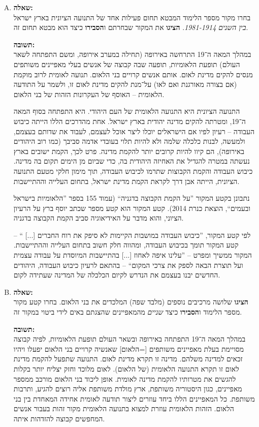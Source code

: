 \documentclass[a4paper]{article}
\newcommand\hl[1]   {#1}
\begin{document}
\begin{enumerate}[A.]
			\item \textbf{שאלה: }\\
			בחרו מקור מספר הלימוד המבטא תחום פעילות אחד של התנועה הציונית בארץ ישראל \textit{בין השנים 1981-1914}. \textbf{הציגו} את המקור שבחרתם ו\textbf{הסבירו} כיצד הוא מבטא תחום זה. 
			
			\textbf{תשובה: }\\ 
			במהלך המאה ה־19 התרחשה באירופה (תחילה במערב אירופה, ומשם התפתחה לשאר העולם) תופעת הלאומיות, תופעה שבה קבוצה של אנשים בעלי מאפיינים משותפים מנסים להקים מדינת לאום. אותם אנשים קרויים בני הלאום. תנועה לאומית לרוב מוקמת (אם בצורה מאורגנת ואם לאו) על־מנת להקים מדינת לאום זו, ולשמר על התודעה הלאומית – האוסף של העקרונות הזהות של בני הלאום. 
			
			התנועה הציונית היא התנועה הלאומית של העם היהודי. היא התפתחה בסוף המאה ה־19, ומטרתה להקים מדינה יהודית בארץ ישראל. אחת מהדרכים הללו הייתה כיבוש העבודה – רעיון לפיו אם הישראלים יוכלו ליצר אוכל לעצמם, לעבוד את שדותם בעצמם, ולמעשה, לבנות כלכלה שלמה ולא להיות תלוי בעובדי אדמה סביבך (כמו רוב היהודים באירופה), הם קיוו להיות קרובים יותר להקמת מדינה. פרט לכך, הקמת ישובים בארץ נעשתה במטרה להגדיל את האחיזה היהודית בה, כדי שביום מן הימים תקום בה מדינה. כיבוש העבודה והקמת הקבוצות שתרמו לכיבוש העבודה, תוך מימון חלקי מטעם התנועה הציונית, הייתה אבן דרך לקראת הקמת מדינת ישראל, בתחום העלייה וההתיישבות. 
			
			נתבונן בקטע המקור ''על הקמת הקבוצה בדגניה`` (עמוד 155 בספר ''הלאומיות בישראל ובעמים``, הוצאת כנרת 2014). קטע המקור הוא קטע מספר שכתב יוסף ברץ על הרעיון הציוני, והוא מדבר על האידיאוגיה סביב הקמת הקבוצה בדגניה. 
			
			לפי קטע המקור, ''כיבוש העבודה במושבות הקיימות לא סיפק את רוח החברים [...] `` – קטע המקור תומך בכיבוש העבודה, ומהווה חלק חשוב בתחום העלייה וההתיישבות. המקור ממשיך ומפרט – ''עלינו איפה לאחוז [...] בהתיישבות המיוסדת על עבודה עצמית ועל תוצרת הבאה לספק את צרכי המקום`` – בהתאם לרעיון כיבוש העבודה, היהודים החדשים יבנו בעצמם את הנדרש לקיום הכלכלה של המדינה שעתידה לקום. 
			
			\item \textbf{שאלה: }\\
			\textbf{הציגו} שלושה מרכיבים נוספים (מלבד שפה) המלכדים את בני הלאום. בחרו קטע מקור מספר הלימוד ו\textbf{הסבירו} כיצד \textit{שניים} מהמאפיינים שהצגתם באים לידי ביטוי במקור זה. 
			
			\textbf{תשובה: }\\
			במהלך המאה ה־19 התפתחה באירופה ובשאר העולם תופעת ה\hl{לאומיות}, לפיה קבוצה מסויימת בעלת מאפיינים משותפים [=\hl{הלאום}] שאנשיה קרויים \hl{בני הלאום} יפעלו ויהיו זכאים למדינה משלהם. מדינה זו תקרא \hl{מדינת לאום}. התנועה שתפעל להקמת מדינת לאום זו תקרא \hl{התנועה הלאומית} (של הלאום). לאום מלוכד וחזק יצליח יותר בקלות להגשים את מטרותיו להקמת מדינה לאומית. אופן ליכוד בני הלאום מורכב ממספר מאפיינים, כגון היסטוריה משותפת, ארץ מולדת משותפת אליה רוצים להגיע, ותרבות משותפת. כל המאפיינים הללו ביחד עוזרים ליצור \hl{תודעה לאומית} אחידה המאחדת בין בני הלאום. הזהות הלאומית עוזרת למצוא בתנועה הלאומית מקור זהות בעבור אנשים המחפשים קבוצה להזדהות איתה. 
			

\end{enumerate}
\end{document}
